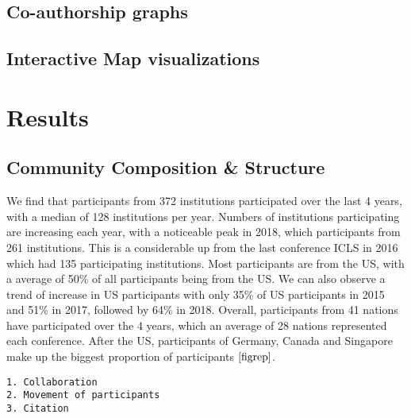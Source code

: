 \documentclass[journal,twocolumn]{IEEEtran}
\begin{document}
    \hypertarget{co-authorship-graphs}{%
\subsection{Co-authorship graphs}\label{co-authorship-graphs}}

\hypertarget{interactive-map-visualizations}{%
\subsection{Interactive Map
visualizations}\label{interactive-map-visualizations}}

    \hypertarget{results}{%
\section{Results}\label{results}}

    \hypertarget{community-composition-structure}{%
\subsection{Community Composition \&
Structure}\label{community-composition-structure}}

We find that participants from 372 institutions participated over the
last 4 years, with a median of 128 institutions per year. Numbers of
institutions participating are increasing each year, with a noticeable
peak in 2018, which participants from 261 institutions. This is a
considerable up from the last conference ICLS in 2016 which had 135
participating institutions. Most participants are from the US, with a
average of 50\% of all participants being from the US. We can also
observe a trend of increase in US participants with only 35\% of US
participants in 2015 and 51\% in 2017, followed by 64\% in 2018.
Overall, participants from 41 nations have participated over the 4
years, which an average of 28 nations represented each conference. After
the US, participants of Germany, Canada and Singapore make up the
biggest proportion of participants \(\ref{figrep}\).

\begin{verbatim}
1. Collaboration
2. Movement of participants
3. Citation
\end{verbatim}


    \begin{figure}
        \begin{center}\end{center}
        \caption{}
        \label{}
    \end{figure}
    
\end{document}
